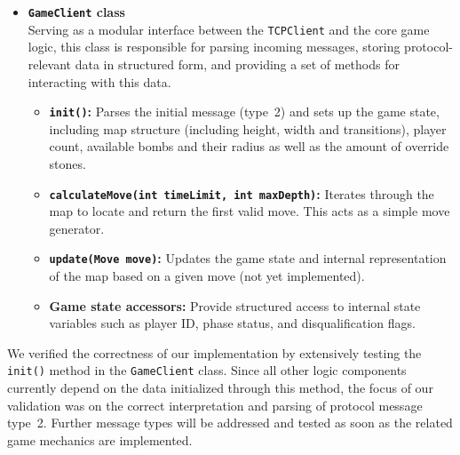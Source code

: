 \begin{itemize}
    The goal of this method is to interpret and persist all relevant game data in a structured and efficient manner, making it accessible to other modules within the client. Message types~3,~6,~7,~8, and~9 are especially important for tracking the player's identity, opponents' moves, disqualifications, and phase transitions.

    During this development stage, message types~2,~4, and~5 were particularly relevant. Type~2 includes the initial game state (e.g., map layout), which is parsed and stored by the \texttt{GameClient}. When the server sends a move request (type~4), the client responds within the specified time limit using a valid move (type~5), generated via a simple brute-force strategy as implemented in \texttt{calculateMove(int\allowbreak timeLimit,\allowbreak int\allowbreak maxDepth)}.

    \item \textbf{\texttt{GameClient} class} \\
    Serving as a modular interface between the \texttt{TCPClient} and the core game logic, this class is responsible for parsing incoming messages, storing protocol-relevant data in structured form, and providing a set of methods for interacting with this data.

    \begin{itemize}
        \item \textbf{\texttt{init()}:} Parses the initial message (type~2) and sets up the game state, including map structure (including height, width and transitions), player count, available bombs and their radius as well as the amount of override stones.
        \item \textbf{\texttt{calculateMove(int timeLimit, int maxDepth)}:} Iterates through the map to locate and return the first valid move. This acts as a simple move generator.
        \item \textbf{\texttt{update(Move move)}:} Updates the game state and internal representation of the map based on a given move (not yet implemented).
        \item \textbf{Game state accessors:} Provide structured access to internal state variables such as player ID, phase status, and disqualification flags.
    \end{itemize}
\end{itemize}

\noindent
We verified the correctness of our implementation by extensively testing the \texttt{init()} method in the \texttt{GameClient} class. Since all other logic components currently depend on the data initialized through this method, the focus of our validation was on the correct interpretation and parsing of protocol message type~2. Further message types will be addressed and tested as soon as the related game mechanics are implemented.


